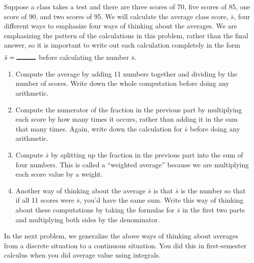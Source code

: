 \begin{problem}\label{average value methods}
  Suppose a class takes a test and there are three scores of 70, five scores of 85, one score of 90, and two scores of 95.  We will calculate the average class score, $\bar s$, four different ways to emphasize four ways of thinking about the averages.  We are emphasizing the pattern of the calculations in this problem, rather than the final answer, so it is important to write out each calculation completely in the form $\bar s = \blank{1cm}$ before calculating the number $\bar s$.
  \begin{enumerate}
  \item {}%
 Compute the average by adding 11 numbers together and dividing by the number of scores.   Write down the whole computation before doing any arithmetic.
  \item {}%
Compute the numerator of the fraction in the previous part by multiplying each score by how many times it occurs, rather than adding it in the sum that many times.  Again, write down the calculation for $\bar s$ before doing any arithmetic.
  \item {}%
Compute $\bar s$ by splitting up the fraction in the previous part into the sum of four numbers.  This is called a ``weighted average'' because we are multiplying each score value by a weight.
  \item {}%
Another way of thinking about the average $\bar s$ is that $\bar s$ is the number so that if all 11 scores were $\bar s$, you'd have the same sum.  Write this way of thinking about these computations by taking the formulas for $\bar s$ in the first two parts and multiplying both sides by the denominator.
  \end{enumerate}
\end{problem}

In the next problem, we generalize the above ways of thinking about averages from a discrete situation to a continuous situation.  You did this in first-semester calculus when you did average value using integrals.

